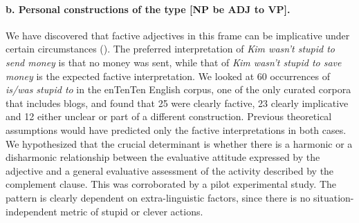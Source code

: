 \documentclass[10pt]{article}
\begin{document}
\paragraph{b. Personal constructions of the type [NP be ADJ to VP].}
We have discovered that factive adjectives in this frame can be implicative under certain circumstances (\cite{csli-gang-cssp13}). 
The preferred interpretation of \textit{Kim wasn't stupid to send money} is that no money was sent, while that of \textit{Kim wasn't stupid to save money} is the expected factive interpretation. We looked at 60 occurrences of \textit{is/was stupid to} in the enTenTen English corpus, one of the only curated corpora that includes blogs, and found that 25 were clearly factive, 23 clearly implicative and 12 either unclear or part of a different construction. Previous theoretical assumptions would have predicted only the factive interpretations in both cases. We hypothesized that the crucial determinant is whether there is a harmonic or a disharmonic relationship between the evaluative attitude expressed by the adjective and a general  evaluative assessment of the activity described by the complement clause.  
This  was corroborated by a pilot experimental study. The  pattern is clearly dependent on extra-linguistic factors, since there is no situation-independent metric of stupid or clever actions. 


\end{document}
